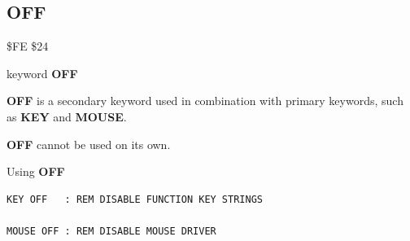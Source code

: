 
\newpage
\subsection{OFF}
\begin{description}[leftmargin=2cm,style=nextline]
\item [Token:]    \$FE \$24

\item [Format:]   keyword {\bf OFF}

\item [Usage:]    {\bf OFF} is a secondary keyword used in combination with primary keywords, such as {\bf KEY} and {\bf MOUSE}.

\item [Remarks:]  {\bf OFF} cannot be used on its own.

\item [Examples:] Using {\bf OFF}

\begin{tcolorbox}[colback=black,coltext=white]
\verbatimfont{\codefont}
\begin{verbatim}
KEY OFF   : REM DISABLE FUNCTION KEY STRINGS

MOUSE OFF : REM DISABLE MOUSE DRIVER
\end{verbatim}
\end{tcolorbox}
\end{description}


\newpage
